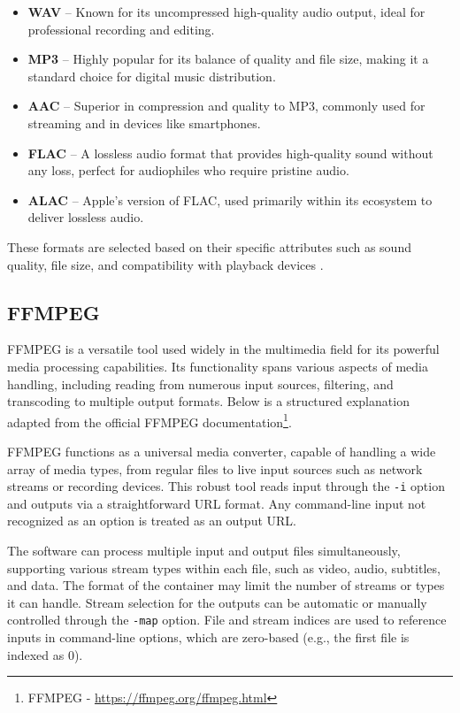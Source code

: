 \begin{itemize}
    \item \textbf{WAV} -- Known for its uncompressed high-quality audio output, ideal for professional recording and editing. \label{theory:wav}
    \item \textbf{MP3} -- Highly popular for its balance of quality and file size, making it a standard choice for digital music distribution.
    \item \textbf{AAC} -- Superior in compression and quality to MP3, commonly used for streaming and in devices like smartphones.
    \item \textbf{FLAC} -- A lossless audio format that provides high-quality sound without any loss, perfect for audiophiles who require pristine audio.
    \item \textbf{ALAC} -- Apple's version of FLAC, used primarily within its ecosystem to deliver lossless audio.
\end{itemize}

These formats are selected based on their specific attributes such as sound quality, file size, and compatibility with playback devices \cite{AdobeAudioFormats}.

\subsection{FFMPEG}
\label{theory:ffmpeg}

FFMPEG is a versatile tool used widely in the multimedia field for its powerful media processing capabilities. Its functionality spans various aspects of media handling, including reading from numerous input sources, filtering, and transcoding to multiple output formats. Below is a structured explanation adapted from the official FFMPEG documentation\footnote{FFMPEG - \url{https://ffmpeg.org/ffmpeg.html}}.

FFMPEG functions as a universal media converter, capable of handling a wide array of media types, from regular files to live input sources such as network streams or recording devices. This robust tool reads input through the \texttt{-i} option and outputs via a straightforward URL format. Any command-line input not recognized as an option is treated as an output URL.

The software can process multiple input and output files simultaneously, supporting various stream types within each file, such as video, audio, subtitles, and data. The format of the container may limit the number of streams or types it can handle. Stream selection for the outputs can be automatic or manually controlled through the \texttt{-map} option. File and stream indices are used to reference inputs in command-line options, which are zero-based (e.g., the first file is indexed as 0).

